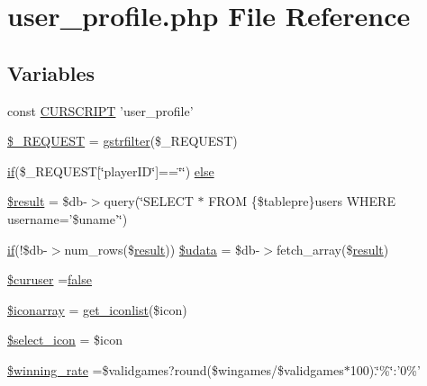 \hypertarget{user__profile_8php}{\section{user\+\_\+profile.\+php File Reference}
\label{user__profile_8php}
}
\subsection*{Variables}
\begin{DoxyCompactItemize}
\item 
const \hyperlink{user__profile_8php_a39c39f525eceb86cabc338804f230e80}{C\+U\+R\+S\+C\+R\+I\+P\+T} 'user\+\_\+profile'
\item 
\hyperlink{user__profile_8php_a0e4b7f3b6c609258c08660a1ec52b89b}{\$\+\_\+\+R\+E\+Q\+U\+E\+S\+T} = \hyperlink{global_8func_8php_a2b7ece9137321f3300ce816cab600087}{gstrfilter}(\$\+\_\+\+R\+E\+Q\+U\+E\+S\+T)
\item 
\hyperlink{login__old_8php_a4ac1118c2e44c513a674bc1793ba6c90}{if}(\$\+\_\+\+R\+E\+Q\+U\+E\+S\+T\mbox{[}\char`\"{}player\+I\+D\char`\"{}\mbox{]}==\char`\"{}\char`\"{}) \hyperlink{user__profile_8php_ab95e1976f519b0bd6d0c0804bec3e258}{else}
\item 
\hyperlink{user__profile_8php_a112ef069ddc0454086e3d1e6d8d55d07}{\$result} = \$db-\/$>$query(\char`\"{}S\+E\+L\+E\+C\+T $\ast$ F\+R\+O\+M \{\$tablepre\}users W\+H\+E\+R\+E username='\$uname'\char`\"{})
\item 
\hyperlink{login__old_8php_a4ac1118c2e44c513a674bc1793ba6c90}{if}(!\$db-\/$>$num\+\_\+rows(\$\hyperlink{templates_2install_8php_abdecde238169a1e34f68354fc9968af0}{result})) \hyperlink{user__profile_8php_aa64a6e7c321a5fc5c5089fc201f285cb}{\$udata} = \$db-\/$>$fetch\+\_\+array(\$\hyperlink{templates_2install_8php_abdecde238169a1e34f68354fc9968af0}{result})
\item 
\hyperlink{user__profile_8php_aeb4d2776248b452f64c63063379d2035}{\$curuser} =\hyperlink{1__chat_8tpl_8php_a5df37b7f02e5cdc7d9412b7f872b8e01}{false}
\item 
\hyperlink{user__profile_8php_ae8f70f9240aceaf398e05d6e00e7b8e5}{\$iconarray} = \hyperlink{user_8func_8php_a7a9045f8927edbb8c9fd22b5f9effd7c}{get\+\_\+iconlist}(\$icon)
\item 
\hyperlink{user__profile_8php_a18d851a26297fb49eda4d94e0605ba05}{\$select\+\_\+icon} = \$icon
\item 
\hyperlink{user__profile_8php_ad82881aa9b7ef451f827d30a6f85b152}{\$winning\+\_\+rate} =\$validgames?round(\$wingames/\$validgames$\ast$100).\char`\"{}\%\char`\"{}\+:'0\%'

\end{DoxyCompactItemize}
